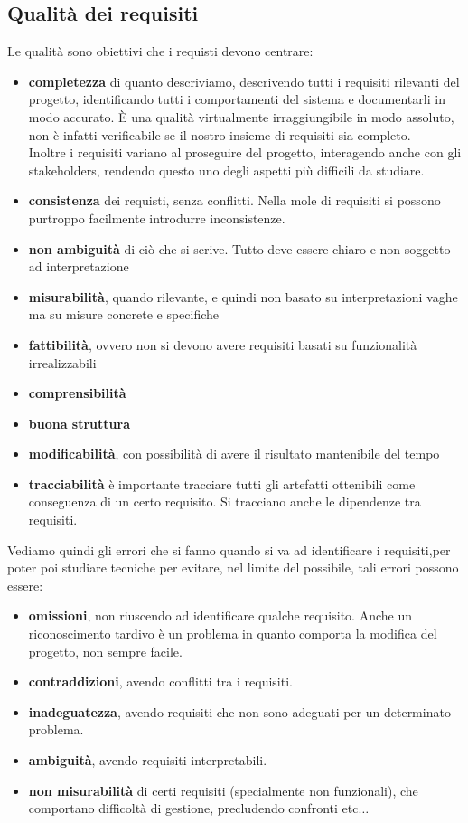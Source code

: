 \subsection{Qualità dei requisiti}
Le qualità sono obiettivi che i requisti devono  centrare:
\begin{itemize} 
    \item \textbf{completezza} di quanto descriviamo, descrivendo tutti i requisiti rilevanti del progetto, identificando tutti i comportamenti del sistema e documentarli in modo accurato. È una qualità virtualmente irraggiungibile in modo assoluto, non è infatti verificabile se il nostro insieme di requisiti sia completo.\\ Inoltre i requisiti variano al proseguire del progetto, interagendo anche con gli stakeholders, rendendo questo uno degli aspetti più difficili da studiare.
    \item \textbf{consistenza} dei requisti, senza conflitti. Nella mole di requisiti si possono purtroppo facilmente introdurre inconsistenze.
    \item \textbf{non ambiguità} di ciò che si scrive. Tutto deve essere chiaro e non soggetto ad interpretazione 
    \item \textbf{misurabilità}, quando rilevante, e quindi non basato su interpretazioni vaghe ma su misure concrete e specifiche 
    \item \textbf{fattibilità}, ovvero non si devono avere requisiti basati su funzionalità irrealizzabili 
    \item \textbf{comprensibilità} 
    \item \textbf{buona struttura}
    \item \textbf{modificabilità}, con possibilità di avere il risultato mantenibile del tempo 
    \item \textbf{tracciabilità} è importante tracciare tutti gli artefatti ottenibili come conseguenza di un certo requisito. Si tracciano anche le dipendenze tra requisiti.
\end{itemize}
Vediamo quindi gli errori che si fanno quando si va ad identificare i requisiti,per poter poi studiare tecniche per evitare, nel limite del possibile, tali errori possono essere:
\begin{itemize}
  \item \textbf{omissioni}, non riuscendo ad identificare qualche requisito. Anche un riconoscimento tardivo è un problema in quanto comporta la modifica del progetto, non sempre facile.
  \item \textbf{contraddizioni}, avendo conflitti tra i requisiti.
  \item \textbf{inadeguatezza}, avendo requisiti che non sono adeguati per un determinato problema.
  \item \textbf{ambiguità}, avendo requisiti interpretabili.
  \item \textbf{non misurabilità} di certi requisiti (specialmente non funzionali), che comportano difficoltà di gestione, precludendo confronti etc$\ldots$ 
\end{itemize}

